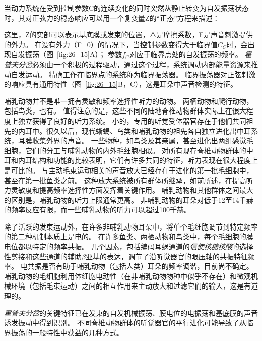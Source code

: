 \begin{proposition} \label{box:26_1}
	
	\quad \quad 当动力系统在受到控制参数C的连续变化的同时突然从静止转变为自发振荡状态时，其对正弦力的稳态响应可以用一个复变量Z的“正态”方程来描述：
	
	\quad \quad 这里，Z的实部可以表示基底膜或发束的位置，∧是摩擦系数，F是声音刺激提供的外力。
	在没有外力（F=0）的情况下，当控制参数变得大于临界值$C_C$时，会出现自发振荡（图~\ref{fig:26_15}A）；
	参数$f_C$对应于临界点处的自发振荡的频率。
	\textit{霍普夫分岔}必须由一个积极的过程驱动，通过这个过程，系统调动内部能量资源来推动自发运动。
	精确工作在临界点的系统称为临界振荡器。
	临界振荡器对正弦刺激的响应具有通用特性（图~\ref{fig:26_15}B，C），这是耳朵中声音检测的特征。
	
	\quad \quad 哺乳动物并不是唯一拥有灵敏和频率选择性听力的动物。
	两栖动物和爬行动物，包括鸟类，也有。
	值得注意的是，这些不同的陆地脊椎动物群体实际上在很大程度上独立获得了良好的听力系统。
	小的，专用的听觉受体器官存在于他们共同祖先的内耳中。很久以后，现代蜥蜴、鸟类和哺乳动物的祖先各自独立进化出中耳系统，耳膜收集外界的声音。
	一些物种，如鸟类及其亲属，甚至进化出两组感觉毛细胞，它们的分工与哺乳动物的内外毛细胞相似。
	对所有现存脊椎动物群体的中耳和内耳结构和功能的比较表明，它们有许多共同的特征，听力表现在很大程度上是可比的。
	与主动毛束运动相关的声音放大已经存在于进化的第一批毛细胞中，甚至在第一批鱼类之前。
	这种放大系统被所有群体所继承，如前所述，在提高听力灵敏度和提高频率选择性方面发挥着关键作用。
	哺乳动物和其他群体之间最大的区别是，哺乳动物的听力上限通常更高。
	非哺乳动物的耳朵对低于12至14千赫的频率反应有限，而一些哺乳动物的听力可以超过100千赫。
	
	\quad \quad 除了活跃的发束运动外，在许多非哺乳动物耳朵中，将单个毛细胞调节到特定频率的第二种机制本质上是电的。
	在许多鱼类、两栖动物和鸟类中，每个毛细胞的膜电位都以特定的频率共振。
	几个因素，包括编码耳蜗通道的\textit{信使核糖核酸}的选择性剪接和这些通道的辅助$\beta$亚基的表达，调节了沿听觉器官的眼压轴的共振特征频率。
	电共振是否有助于哺乳动物（包括人类）耳朵的频率调谐，目前尚不确定。
	哺乳动物的毛细胞利用体细胞电动性（在非哺乳动物物种中似乎不存在）和微观机械环境（包括毛束运动）之间的相互作用来主动放大和过滤它们的输入，这是有道理的。
	
	\quad \quad \textit{霍普夫分岔}的关键特征已在发束的自发机械振荡、膜电位的电振荡和基底膜的声音诱发振动中得到识别。
	不同脊椎动物群体的听觉器官的平行进化可能导致了从临界振荡的一般特性中获益的几种方式。
	
\end{proposition}


